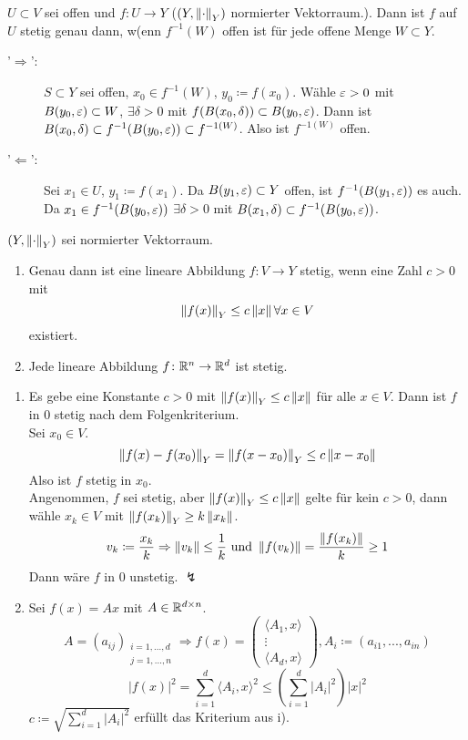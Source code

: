 \begin{lemma}
	$ U\subset V $ sei offen und $ f\colon U\rightarrow Y $ ($ (Y,\left\|\cdot\right\|_Y) $ normierter Vektorraum.). Dann ist $ f $ auf $ U $ stetig genau dann, w(enn $ f^{-1}(W) $ offen ist f\"ur jede offene Menge $ W\subset Y $.
\end{lemma}
\begin{beweis}
	\begin{description}
		\item['$ \Rightarrow $':] $ S\subset Y $ sei offen, $ x_0\in f^{-1}(W) $, $ y_0\coloneqq f(x_0) $. W\"ahle $ \varepsilon>0 $ mit $ B(y_0,\varepsilon)\subset W $, $ \exists\delta>0 $ mit $ f(B(x_0,\delta))\subset B(y_0,\varepsilon) $. Dann ist $ B(x_0,\delta)\subset f^{-1}(B(y_0,\varepsilon))\subset f^{-1(W)} $. Also ist $ f^{-1(W)} $ offen.
		\item['$ \Leftarrow $':] Sei $ x_1\in U $, $ y_1\coloneqq f(x_1) $. Da $ B(y_1,\varepsilon)\subset Y $ offen, ist $ f^{-1}(B(y_1,\varepsilon)) $ es auch. Da $ x_1\in f^{-1}(B(y_0,\varepsilon)) $ $ \exists \delta>0 $ mit $ B(x_1,\delta)\subset f^{-1}(B(y_0,\varepsilon)) $.
	\end{description}
\end{beweis}
\begin{lemma}
	$ (Y,\left\|\cdot\right\|_Y) $ sei normierter Vektorraum.
	\begin{enumerate}
		\item Genau dann ist eine lineare Abbildung $ f\colon V\rightarrow Y $ stetig, wenn eine Zahl $ c>0 $ mit \[ \left\|f(x)\right\|_Y\leq c\left\|x\right\|\forall x\in V \] existiert.
		\item Jede lineare Abbildung $ f\colon \mathbb{R}^n\rightarrow \mathbb{R}^d $ ist stetig.
	\end{enumerate}
\end{lemma}
\begin{beweis}
	\begin{enumerate}
		\item Es gebe eine Konstante $ c>0 $ mit $ \left\|f(x)\right\|_Y\leq c\left\|x\right\| $ f\"ur alle $ x\in V $. Dann ist $ f $ in $ 0 $ stetig nach dem Folgenkriterium.\\
		Sei $ x_0\in V $.
		\[ \left\|f(x)-f(x_0)\right\|_Y=\left\|f(x-x_0)\right\|_Y\leq c\left\|x-x_0\right\| \]
		Also ist $ f $ stetig in $ x_0 $.\\
		Angenommen, $ f $ sei stetig, aber $ \left\|f(x)\right\|_Y\leq c\left\|x\right\| $ gelte f\"ur kein $ c>0 $, dann w\"ahle $ x_k\in V $ mit $ \left\|f(x_k)\right\|_Y\geq k\left\|x_k\right\| $.
		\[ v_k\coloneqq\frac{x_k}{k}\Rightarrow\left\|v_k\right\|\leq\frac{1}{k}\text{ und }\left\|f(v_k)\right\|=\frac{\left\|f(x_k)\right\|}{k}\geq 1 \]
		Dann w\"are $ f $ in $ 0 $ unstetig. $ \lightning $
		\item Sei $ f(x)=Ax $ mit $ A\in\mathbb{R}^{d\times n} $.
		\[ A=(a_{ij})_{\substack{i=1,...,d\\j=1,...,n}}\Rightarrow f(x)=\begin{pmatrix}
		\langle A_1,x\rangle\\\vdots\\\langle A_d,x\rangle
		\end{pmatrix}, A_i\coloneqq(a_{i1},...,a_{in}) \]
		\[ |f(x)|^2=\sum_{i=1}^d \langle A_i,x\rangle^2\leq\left(\sum_{i=1}^{d}|A_i|^2\right)|x|^2 \]
		$ c\coloneqq\sqrt{\sum_{i=1}^{d}|A_i|^2} $ erf\"ullt das Kriterium aus i).	 
	\end{enumerate}
\end{beweis}
